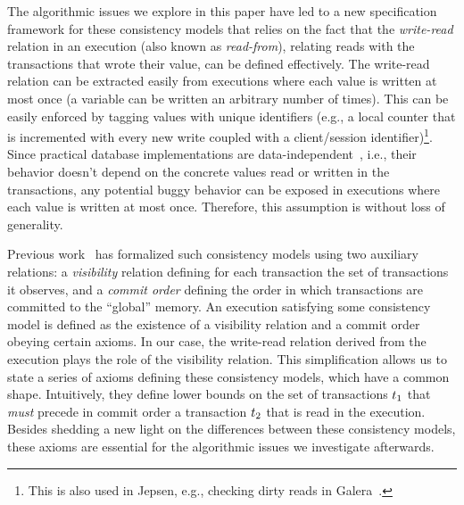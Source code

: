 The algorithmic issues we explore in this paper have led to a new specification framework for these consistency models that relies on the fact that the \emph{write-read} relation in an execution (also known as \emph{read-from}), relating reads with the transactions that wrote their value, can be defined effectively. The write-read relation can be extracted easily from executions where each value is written at most once (a variable can be written an arbitrary number of times). This can be easily enforced by tagging values with unique identifiers (e.g., a local counter that is incremented with every new write coupled with a client/session identifier)\footnote{This is also used in Jepsen, e.g., checking dirty reads in Galera~\cite{jepsen-galera}.}. Since practical database implementations are data-independent~\cite{DBLP:conf/popl/Wolper86}, i.e., their behavior doesn't depend on the concrete values read or written in the transactions, any potential buggy behavior can be exposed in executions where each value is written at most once. Therefore, this assumption is without loss of generality.

Previous work~\cite{DBLP:conf/popl/BouajjaniEGH17,DBLP:conf/popl/BurckhardtGYZ14,DBLP:conf/concur/Cerone0G15} has formalized such consistency models using two auxiliary relations: a \emph{visibility} relation defining for each transaction the set of transactions it observes, and a \emph{commit order} defining the order in which transactions are committed to the ``global'' memory. An execution satisfying some consistency model is defined as the existence of a visibility relation and a commit order obeying certain axioms. In our case, the write-read relation derived from the execution plays the role of the visibility relation. This simplification allows us to state a series of axioms defining these consistency models, which have a common shape. Intuitively, they define lower bounds on the set of transactions ${t}_1$ that \emph{must} precede in commit order a transaction ${t}_2$ that is read in the execution. Besides shedding a new light on the differences between these consistency models, these axioms are essential for the algorithmic issues we investigate afterwards.

